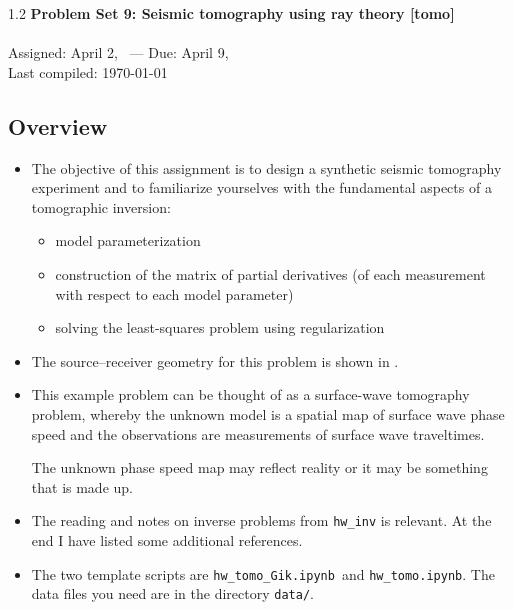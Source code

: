 \documentclass[11pt,titlepage,fleqn]{article}
\newcommand{\tfiletomo}{{\tt hw\_tomo.ipynb}}
\newcommand{\tfileGik}{{\tt hw\_tomo\_Gik.ipynb}}
\begin{document}

\begin{spacing}{1.2}
\centering
{\large \bf Problem Set 9: Seismic tomography using ray theory [tomo]} \\
\cltag\ \\
Assigned: April 2, \cyear\ --- Due: April 9, \cyear\ \\
Last compiled: \today
\end{spacing}


\subsection*{Overview}

\begin{itemize}

\item The objective of this assignment is to design a synthetic seismic tomography experiment and to familiarize yourselves with the fundamental aspects of a tomographic inversion:
%
\begin{itemize}
\item model parameterization
\item construction of the matrix of partial derivatives (of each measurement with respect to each model parameter)
\item solving the least-squares problem using regularization
\end{itemize}

\item The source--receiver geometry for this problem is shown in .

\item This example problem can be thought of as a surface-wave tomography problem, whereby the unknown model is a spatial map of surface wave phase speed and the observations are measurements of surface wave traveltimes.

The unknown phase speed map may reflect reality or it may be something that is made up.

\item The reading and notes on inverse problems from \verb+hw_inv+ is relevant.
At the end I have listed some additional references.
\nocite{Tape2007,Menke,AsterE2,Tarantola2005}

\item 
The two template scripts are \tfileGik\ and \tfiletomo.
The data files you need are in the directory \verb+data/+. \\

\end{itemize}
\end{document}
